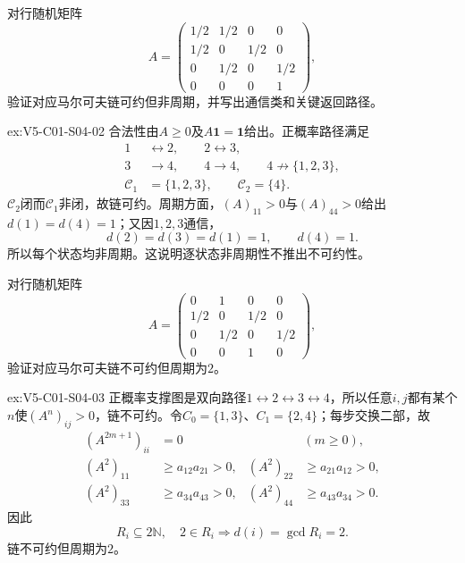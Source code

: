 \begin{SLChapterExercisePairSection}
\begin{exercise}\label{ex:V5-C01-S04-02}
对行随机矩阵
\[
A=\begin{pmatrix}
1/2&1/2&0&0\\
1/2&0&1/2&0\\
0&1/2&0&1/2\\
0&0&0&1
\end{pmatrix},
\]
验证对应马尔可夫链可约但非周期，并写出通信类和关键返回路径。
\end{exercise}
\ifSLFullEdition
{}\label{sol:V5-C01-S04-02}
\begin{chapterexercisesolution}{ex:V5-C01-S04-02}
合法性由$A\ge0$及$A\boldsymbol1=\boldsymbol1$给出。正概率路径满足
\[
\begin{aligned}
1&\leftrightarrow2,\qquad 2\leftrightarrow3,\\
3&\to4,\qquad 4\to4,\qquad 4\not\to\{1,2,3\},\\
\mathcal C_1&=\{1,2,3\},\qquad \mathcal C_2=\{4\}.
\end{aligned}
\]
$\mathcal C_2$闭而$\mathcal C_1$非闭，故链可约。周期方面，$(A)_{11}>0$与$(A)_{44}>0$给出$d(1)=d(4)=1$；又因$1,2,3$通信，
\[
d(2)=d(3)=d(1)=1,\qquad d(4)=1.
\]
所以每个状态均非周期。这说明逐状态非周期性不推出不可约性。
\end{chapterexercisesolution}
\fi

\begin{exercise}\label{ex:V5-C01-S04-03}
对行随机矩阵
\[
A=\begin{pmatrix}
0&1&0&0\\
1/2&0&1/2&0\\
0&1/2&0&1/2\\
0&0&1&0
\end{pmatrix},
\]
验证对应马尔可夫链不可约但周期为$2$。
\end{exercise}
\ifSLFullEdition
{}\label{sol:V5-C01-S04-03}
\begin{chapterexercisesolution}{ex:V5-C01-S04-03}
正概率支撑图是双向路径$1\leftrightarrow2\leftrightarrow3\leftrightarrow4$，所以任意$i,j$都有某个$n$使$(A^n)_{ij}>0$，链不可约。令$C_0=\{1,3\}$、$C_1=\{2,4\}$；每步交换二部，故
\[
\begin{aligned}
(A^{2m+1})_{ii}&=0 &&(m\ge0),\\
(A^2)_{11}&\ge a_{12}a_{21}>0,&
(A^2)_{22}&\ge a_{21}a_{12}>0,\\
(A^2)_{33}&\ge a_{34}a_{43}>0,&
(A^2)_{44}&\ge a_{43}a_{34}>0.
\end{aligned}
\]
因此
\[
R_i\subseteq2\mathbb N,\quad 2\in R_i
\Longrightarrow d(i)=\gcd R_i=2.
\]
链不可约但周期为$2$。
\end{chapterexercisesolution}
\fi


\end{SLChapterExercisePairSection}
